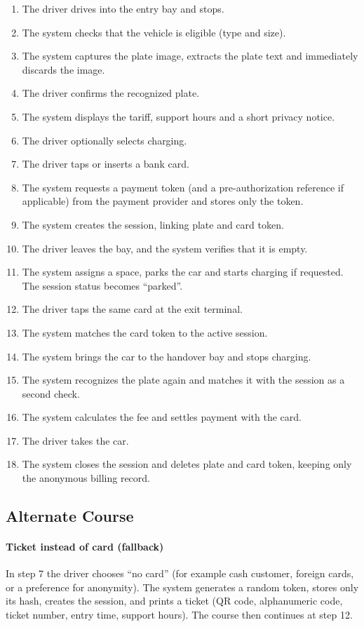 \documentclass[11pt,a4paper]{article}
\begin{document}
\begin{enumerate}
    \item The driver drives into the entry bay and stops.
    \item The system checks that the vehicle is eligible (type and size).
    \item The system captures the plate image, extracts the plate text and
    immediately discards the image.
    \item The driver confirms the recognized plate.
    \item The system displays the tariff, support hours and a short privacy
    notice.
    \item The driver optionally selects charging.
    \item The driver taps or inserts a bank card.
    \item The system requests a payment token (and a pre-authorization
    reference if applicable) from the payment provider and stores only
    the token.
    \item The system creates the session, linking plate and card token.
    \item The driver leaves the bay, and the system verifies that it is empty.
    \item The system assigns a space, parks the car and starts charging if
    requested. The session status becomes ``parked''.
    \item The driver taps the same card at the exit terminal.
    \item The system matches the card token to the active session.
    \item The system brings the car to the handover bay and stops charging.
    \item The system recognizes the plate again and matches it with the
    session as a second check.
    \item The system calculates the fee and settles payment with the card.
    \item The driver takes the car.
    \item The system closes the session and deletes plate and card token,
    keeping only the anonymous billing record.
\end{enumerate}

\subsection*{Alternate Course}

\paragraph{Ticket instead of card (fallback)}
In step 7 the driver chooses ``no card'' (for example cash customer,
foreign cards, or a preference for anonymity). The system generates a
random token, stores only its hash, creates the session, and prints a
ticket (QR code, alphanumeric code, ticket number, entry time,
support hours). The course then continues at step 12.
\end{document}
